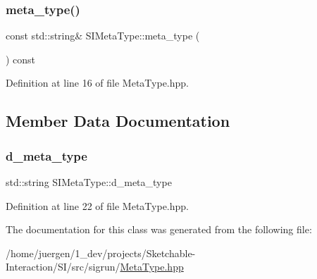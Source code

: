 \subsubsection{\texorpdfstring{meta\_type()}{meta\_type()}}
{\footnotesize\ttfamily const std\+::string\& S\+I\+Meta\+Type\+::meta\+\_\+type (\begin{DoxyParamCaption}{ }\end{DoxyParamCaption}) const\hspace{0.3cm}{\ttfamily [inline]}}



Definition at line 16 of file Meta\+Type.\+hpp.



\subsection{Member Data Documentation}
\mbox{\label{class_s_i_meta_type_a80557111c337358d1007832bcc403cd3}} 
\subsubsection{\texorpdfstring{d\_meta\_type}{d\_meta\_type}}
{\footnotesize\ttfamily std\+::string S\+I\+Meta\+Type\+::d\+\_\+meta\+\_\+type\hspace{0.3cm}{\ttfamily [protected]}}



Definition at line 22 of file Meta\+Type.\+hpp.



The documentation for this class was generated from the following file\+:\begin{DoxyCompactItemize}
\item 
/home/juergen/1\+\_\+dev/projects/\+Sketchable-\/\+Interaction/\+S\+I/src/sigrun/\mbox{\hyperlink{_meta_type_8hpp}{Meta\+Type.\+hpp}}\end{DoxyCompactItemize}

